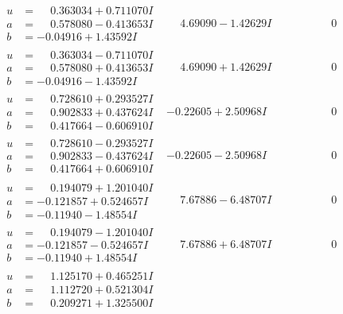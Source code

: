 \documentclass[1p]{elsarticle_modified}
\theoremstyle{definition}
\begin{document}
$$\begin{array}{c|c|c}
\begin{aligned}
u &= \phantom{-}0.363034 + 0.711070 I \\
a &= \phantom{-}0.578080 - 0.413653 I \\
b &= -0.04916 + 1.43592 I\end{aligned}
 & \phantom{-}4.69090 - 1.42629 I & \phantom{-0.000000 } 0 \\ \hline\begin{aligned}
u &= \phantom{-}0.363034 - 0.711070 I \\
a &= \phantom{-}0.578080 + 0.413653 I \\
b &= -0.04916 - 1.43592 I\end{aligned}
 & \phantom{-}4.69090 + 1.42629 I & \phantom{-0.000000 } 0 \\ \hline\begin{aligned}
u &= \phantom{-}0.728610 + 0.293527 I \\
a &= \phantom{-}0.902833 + 0.437624 I \\
b &= \phantom{-}0.417664 - 0.606910 I\end{aligned}
 & -0.22605 + 2.50968 I & \phantom{-0.000000 } 0 \\ \hline\begin{aligned}
u &= \phantom{-}0.728610 - 0.293527 I \\
a &= \phantom{-}0.902833 - 0.437624 I \\
b &= \phantom{-}0.417664 + 0.606910 I\end{aligned}
 & -0.22605 - 2.50968 I & \phantom{-0.000000 } 0 \\ \hline\begin{aligned}
u &= \phantom{-}0.194079 + 1.201040 I \\
a &= -0.121857 + 0.524657 I \\
b &= -0.11940 - 1.48554 I\end{aligned}
 & \phantom{-}7.67886 - 6.48707 I & \phantom{-0.000000 } 0 \\ \hline\begin{aligned}
u &= \phantom{-}0.194079 - 1.201040 I \\
a &= -0.121857 - 0.524657 I \\
b &= -0.11940 + 1.48554 I\end{aligned}
 & \phantom{-}7.67886 + 6.48707 I & \phantom{-0.000000 } 0 \\ \hline\begin{aligned}
u &= \phantom{-}1.125170 + 0.465251 I \\
a &= \phantom{-}1.112720 + 0.521304 I \\
b &= \phantom{-}0.209271 + 1.325500 I\end{aligned}

\end{array}$$
\end{document}

